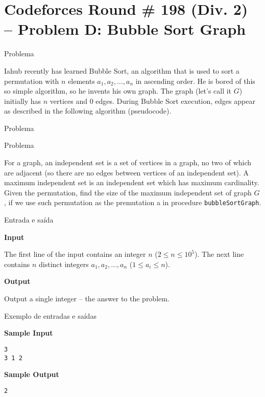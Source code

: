 \section{Codeforces Round \# 198 (Div. 2) -- Problem D: Bubble Sort Graph}

\begin{frame}[fragile]{Problema}

Iahub recently has learned Bubble Sort, an algorithm that is used to sort a permutation with 
$n$ elements $a_1, a_2, \ldots, a_n$ in ascending order. He is bored of this so simple 
algorithm, so he invents his own graph. The graph (let's call it $G$) initially has $n$ 
vertices and 0 edges. During Bubble Sort execution, edges appear as described in the following 
algorithm (pseudocode).

\end{frame}

\begin{frame}[fragile]{Problema}
\end{frame}

\begin{frame}[fragile]{Problema}

For a graph, an independent set is a set of vertices in a graph, no two of which are adjacent 
(so there are no edges between vertices of an independent set). A maximum independent set is an 
independent set which has maximum cardinality. Given the permutation, find the size of the 
maximum independent set of graph $G$, if we use such permutation as the premutation a in 
procedure \texttt{bubbleSortGraph}.

\end{frame}

\begin{frame}[fragile]{Entrada e saída}

\textbf{Input}

The first line of the input contains an integer $n$ ($2\leq n\leq 10^5$). The next line 
contains $n$ distinct integers $a_1, a_2, \ldots, a_n$ ($1\leq a_i\leq n$).

\vspace{0.2in}

\textbf{Output}

Output a single integer -- the answer to the problem.

\end{frame}

\begin{frame}[fragile]{Exemplo de entradas e saídas}

\begin{minipage}[t]{0.45\textwidth}
\textbf{Sample Input}
\begin{verbatim}
3
3 1 2
\end{verbatim}
\end{minipage}
\begin{minipage}[t]{0.5\textwidth}
\textbf{Sample Output}
\begin{verbatim}
2
\end{verbatim}
\end{minipage}
\end{frame}

